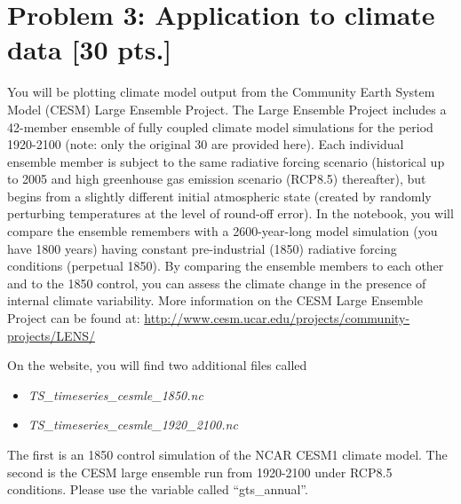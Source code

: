 \section*{Problem 3: Application to climate data [30 pts.]}
You will be plotting climate model output from the Community Earth System Model (CESM) Large Ensemble Project. The Large Ensemble Project includes a 42-member ensemble of fully coupled climate model simulations for the period 1920-2100 (note: only the original 30 are provided here). Each individual ensemble member is subject to the same radiative forcing scenario (historical up to 2005 and high greenhouse gas emission scenario (RCP8.5) thereafter), but begins from a slightly different initial atmospheric state (created by randomly perturbing temperatures at the level of round-off error). In the notebook, you will compare the ensemble remembers with a 2600-year-long model simulation (you have 1800 years) having constant pre-industrial (1850) radiative forcing conditions (perpetual 1850). By comparing the ensemble members to each other and to the 1850 control, you can assess the climate change in the presence of internal climate variability. More information on the CESM Large Ensemble Project can be found at:
\url{http://www.cesm.ucar.edu/projects/community-projects/LENS/}

On the website, you will find two additional files called
\begin{itemize}
\item \textit{TS\_timeseries\_cesmle\_1850.nc}
\item \textit{TS\_timeseries\_cesmle\_1920\_2100.nc}
\end{itemize}
The first is an 1850 control simulation of the NCAR CESM1 climate model. The second is the CESM large ensemble run from 1920-2100 under RCP8.5 conditions. Please use the variable called ``gts\_annual''.

